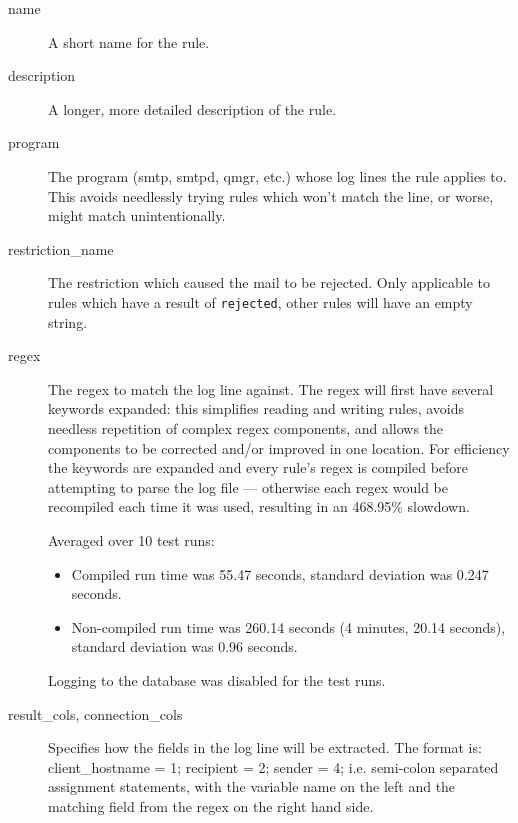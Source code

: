 \documentclass[a4paper,12pt,draft]{article}
\begin{document}
\begin{description}

    \item [name] A short name for the rule.

    \item [description] A longer, more detailed description of the rule.

    \item [program] The program (smtp, smtpd, qmgr, etc.) whose log lines
        the rule applies to.  This avoids needlessly trying rules which
        won't match the line, or worse, might match unintentionally.

    \item [restriction\_name] The restriction which caused the mail to be
        rejected.  Only applicable to rules which have a result of
        \texttt{rejected}, other rules will have an empty string.

    \item [regex] The regex to match the log line against.  The regex will
        first have several keywords expanded: this simplifies reading and
        writing rules, avoids needless repetition of complex regex
        components, and allows the components to be corrected and/or
        improved in one location.  For efficiency the keywords are expanded
        and every rule's regex is compiled before attempting to parse the
        log file --- otherwise each regex would be recompiled each time it
        was used, resulting in an 468.95\% slowdown.

        Averaged over 10 test runs:

        \begin{itemize} 

            \item Compiled run time was 55.47 seconds, standard deviation
                was 0.247 seconds.

            \item Non-compiled run time was 260.14 seconds (4 minutes,
                20.14 seconds), standard deviation was 0.96 seconds.

        \end{itemize}

        Logging to the database was disabled for the test runs.

    \item [result\_cols, connection\_cols] Specifies how the fields in the
        log line will be extracted.  The format is: \newline
        client\_hostname = 1; recipient = 2; sender = 4; \newline
        i.e. semi-colon separated assignment statements, with the variable
        name on the left and the matching field from the regex on the right
        hand side.


\end{description}
\end{document}
